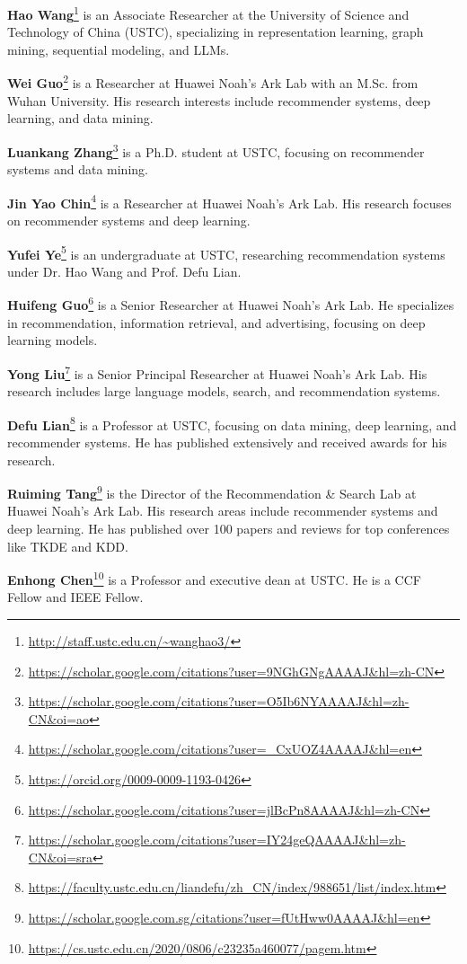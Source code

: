 \textbf{Hao Wang}\footnote{\url{http://staff.ustc.edu.cn/~wanghao3/}} is an Associate Researcher at the University of Science and Technology of China (USTC), specializing in representation learning, graph mining, sequential modeling, and LLMs.

\textbf{Wei Guo}\footnote{\url{https://scholar.google.com/citations?user=9NGhGNgAAAAJ&hl=zh-CN}} is a Researcher at Huawei Noah's Ark Lab with an M.Sc. from Wuhan University. His research interests include recommender systems, deep learning, and data mining.

\textbf{Luankang Zhang}\footnote{\url{https://scholar.google.com/citations?user=O5Ib6NYAAAAJ&hl=zh-CN&oi=ao}} is a Ph.D. student at USTC, focusing on recommender systems and data mining.

\textbf{Jin Yao Chin}\footnote{\url{https://scholar.google.com/citations?user=_CxUOZ4AAAAJ&hl=en}} is a Researcher at Huawei Noah's Ark Lab. His research focuses on recommender systems and deep learning.

\textbf{Yufei Ye}\footnote{\url{https://orcid.org/0009-0009-1193-0426}} is an undergraduate at USTC, researching recommendation systems under Dr. Hao Wang and Prof. Defu Lian.

\textbf{Huifeng Guo}\footnote{\url{https://scholar.google.com/citations?user=jlBcPn8AAAAJ&hl=zh-CN}} is a Senior Researcher at Huawei Noah's Ark Lab. He specializes in recommendation, information retrieval, and advertising, focusing on deep learning models.

\textbf{Yong Liu}\footnote{\url{https://scholar.google.com/citations?user=IY24geQAAAAJ&hl=zh-CN&oi=sra}} is a Senior Principal Researcher at Huawei Noah's Ark Lab. His research includes large language models, search, and recommendation systems.

\textbf{Defu Lian}\footnote{\url{https://faculty.ustc.edu.cn/liandefu/zh_CN/index/988651/list/index.htm}} is a Professor at USTC, focusing on data mining, deep learning, and recommender systems. He has published extensively and received awards for his research.

\textbf{Ruiming Tang}\footnote{\url{https://scholar.google.com.sg/citations?user=fUtHww0AAAAJ&hl=en}} is the Director of the Recommendation \& Search Lab at Huawei Noah's Ark Lab. His research areas include recommender systems and deep learning. He has published over 100 papers and reviews for top conferences like TKDE and KDD.

\textbf{Enhong Chen}\footnote{\url{https://cs.ustc.edu.cn/2020/0806/c23235a460077/pagem.htm}} is a Professor and executive dean at USTC. He is a CCF Fellow and IEEE Fellow.